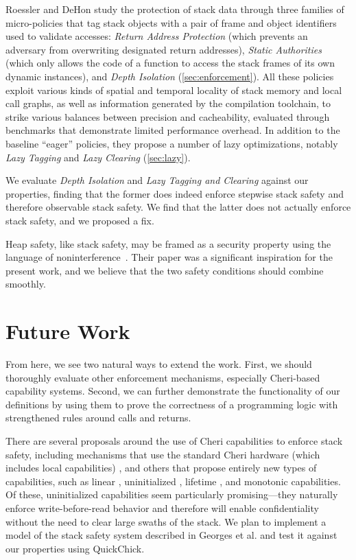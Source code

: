 \documentclass[10pt,conference]{ieeetran}%
\theoremstyle{definition}
\begin{document}
{
%
Roessler and DeHon \cite{DBLP:conf/sp/RoesslerD18}
study the protection of stack data through three families of
micro-policies that tag stack objects with a pair of frame and object identifiers
used to validate accesses: {\em Return Address Protection} (which
prevents an adversary from overwriting designated return addresses), {\em Static
Authorities} (which only allows the code of a function to access the stack frames
of its own dynamic instances), and {\em Depth Isolation}
(\cref{sec:enforcement}). All these policies exploit various kinds of spatial and
temporal locality of stack memory and local call graphs, as well as information
generated by the compilation toolchain, to strike various balances between
precision and cacheability, evaluated through benchmarks that demonstrate
limited performance overhead. In addition to the baseline ``eager'' policies,
they propose a number of lazy optimizations, notably {\em Lazy Tagging} and
{\em Lazy
Clearing} (\cref{sec:lazy}).

We evaluate {\em Depth Isolation} and {\em Lazy Tagging and Clearing}
against our properties, finding that the former does
indeed enforce stepwise stack safety and therefore observable stack
safety. We find that the latter does not actually enforce
stack safety, and we proposed a fix.

%
Heap safety, like stack safety, may be framed as a security property using
the language of
noninterference~\cite{DBLP:conf/post/AmorimHP18}. Their paper was a significant inspiration
for the present work, and we believe that the two safety conditions should
combine smoothly.

\section{Future Work}
\label{sec:future}

From here, we see two natural ways to extend the work. 
First, we should thoroughly evaluate
other enforcement mechanisms, especially Cheri-based capability
systems. Second, we can further demonstrate
the functionality of our definitions by using them to prove
the correctness of a programming logic with strengthened rules around calls and returns.

%
There are several proposals around the use of Cheri capabilities to enforce stack safety,
including mechanisms that use the standard Cheri hardware (which includes local
capabilities) \cite{SkorstengaardLocal},
and others that propose entirely new types of capabilities, such as linear
\cite{SkorstengaardSTK}, uninitialized \cite{Georges+21}, lifetime
\cite{Tsampas+19}, and monotonic \cite{GeorgesComplete} capabilities.
Of these, uninitialized capabilities seem particularly promising---they naturally enforce
write-before-read behavior and therefore will enable confidentiality without the need
to clear large swaths of the stack. We plan to implement a model of the stack safety
system described in Georges et al. \cite{Georges+21} and test it against our properties using
QuickChick.

}
\end{document}
